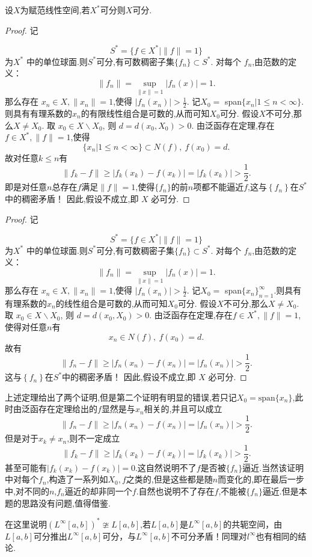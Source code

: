 \documentclass[lang=cn,18pt]{elegantbook}
\begin{document}
\begin{theorem}
    设$X$为赋范线性空间,若$X^*$可分则$X$可分.
\end{theorem}
\begin{proof}
记

$$S^*=\{f\in X^*\mid\|f\|=1\}$$
为$X^*$ 中的单位球面.则$S^*$可分,有可数稠密子集$\{f_n\}\subset S^*.$
对每个 $f_n$,由范数的定义：
$$\|f_n\|=\sup\limits_{\|x\|=1}|f_n(x)|=1.$$
那么存在 $x_n\in X,\|x_n\|=1$,使得 $|f_n(x_n)|>\frac12.$
记$X_0=$ span$\{x_n | 1\leqslant n < \infty\}.$则具有有理系数的$x_n$的有限线性组合是可数的,从而可知$X_0$可分.
假设$X$不可分,那么$X\neq X_0.$
取 $x_0\in X\backslash X_0$, 则 $d= d( x_0, X_0) > 0.$
由泛函存在定理,存在$f\in X^*,\|f\|=1$,使得
$$\{x_n | 1\leqslant n <\infty\}\subset N(f),\:f(x_0)=d.$$
故对任意$k \leqslant n$有
$$\|f_k-f\|\geqslant|f_k(x_k)-f(x_k)|=|f_k(x_k)|>\frac12.$$
即是对任意$n$总存在$f$满足$\|f\|=1$,使得$\{f_n\}$的前$n$项都不能逼近$f$,这与$\left\{f_n\right\}$在$S^*$中的稠密矛盾！ 因此,假设不成立,即 $X$ 必可分.
\end{proof}
\begin{proof}
记

$$S^*=\{f\in X^*\mid\|f\|=1\}$$
为$X^*$ 中的单位球面.则$S^*$可分,有可数稠密子集$\{f_n\}\subset S^*.$
对每个 $f_n$,由范数的定义：
$$\|f_n\|=\sup\limits_{\|x\|=1}|f_n(x)|=1.$$
那么存在 $x_n\in X,\|x_n\|=1$,使得 $|f_n(x_n)|>\frac12.$
记$X_0=$ span$\{x_n\}_{n=1}^{\infty}.$则具有有理系数的$x_n$的线性组合是可数的,从而可知$X_0$可分.
假设$X$不可分,那么$X\neq X_0.$
取 $x_0\in X\backslash X_0$, 则 $d= d( x_0, X_0) > 0.$
由泛函存在定理,存在$f\in X^*,\|f\|=1$,使得对任意$n$有
$$x_n\in N(f),\:f(x_0)=d.$$
故有
$$\|f_n-f\|\geqslant|f_n(x_n)-f(x_n)|=|f_n(x_n)|>\frac12.$$
这与$\left\{f_n\right\}$在$S^*$中的稠密矛盾！ 因此,假设不成立,即 $X$ 必可分.
\end{proof}
\begin{note}
    上述定理给出了两个证明,但是第二个证明有明显的错误,若只记$X_0=\text{span}\{x_n\}$,此时由泛函存在定理给出的$f$显然是与$x_n$相关的,并且可以成立
    $$\|f_n-f\|\geqslant|f_n(x_n)-f(x_n)|=|f_n(x_n)|>\frac{1}{2}.$$
    但是对于$x_k \not= x_n$,则不一定成立
    $$\|f_k-f\|\geqslant|f_k(x_k)-f(x_k)|=|f_k(x_k)|>\frac{1}{2}.$$
    甚至可能有$|f_k(x_k)-f(x_k)|=0$.这自然说明不了$f$是否被$\{f_n\}$逼近.当然该证明中对每个$f_n$,构造了一系列如$X_0,f$之类的,但是这些都是随$n$而变化的,即在最后一步中,对不同的$n$,$f_n$逼近的却非同一个$f$.自然也说明不了存在$f$,不能被$\{f_n\}$逼近.但是本题的思路没有问题,值得借鉴.
\end{note}
\begin{note}
    在这里说明$(L^{\infty}[a,b])^* \ncong  L[a,b]$,若$L[a,b]$是$L^{\infty}[a,b]$的共轭空间，由$L[a,b]$可分推出$L^{\infty}[a,b]$可分，与$L^{\infty}[a,b]$不可分矛盾！同理对$l^{\infty}$也有相同的结论.
\end{note}
\end{document}
